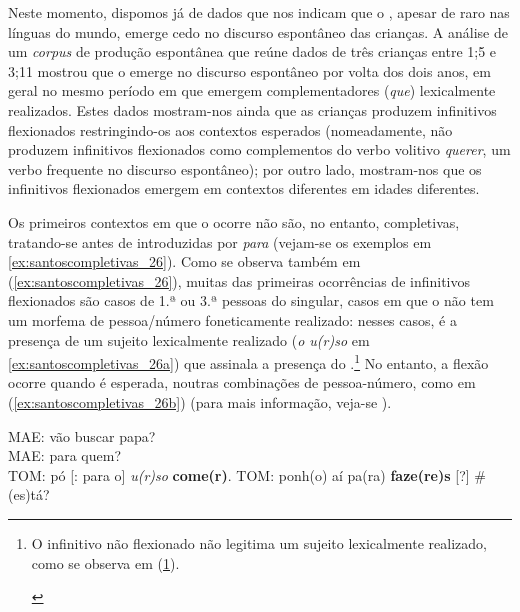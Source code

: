 \documentclass[output=paper]{LSP/langsci}
\begin{document}
Neste momento, dispomos já de dados que nos indicam que o , apesar de raro nas línguas do mundo, emerge cedo no discurso espontâneo das crianças. A análise de um \textit{corpus} de produção espontânea que reúne dados de três crianças entre 1;5 e 3;11 mostrou que o  emerge no discurso espontâneo por volta dos dois anos, em geral no mesmo período em que emergem complementadores (\textit{que}) lexicalmente realizados. Estes dados mostram-nos ainda que as crianças produzem infinitivos flexionados restringindo-os aos contextos esperados (nomeadamente, não produzem infinitivos flexionados como complementos do verbo volitivo \textit{querer}, um verbo frequente no discurso espontâneo); por outro lado, mostram-nos que os infinitivos flexionados emergem em contextos diferentes em idades diferentes.

Os primeiros contextos em que o  ocorre não são, no entanto, completivas, tratando-se antes de  introduzidas por \textit{para} (vejam-se os exemplos em \ref{ex:santoscompletivas_26}). Como se observa também em (\ref{ex:santoscompletivas_26}), muitas das primeiras ocorrências de infinitivos flexionados são casos de 1.ª ou 3.ª pessoas do singular, casos em que o  não tem um morfema de pessoa/número foneticamente realizado: nesses casos, é a presença de um sujeito lexicalmente realizado (\textit{o u(r)so} em \ref{ex:santoscompletivas_26a}) que assinala a presença do .\footnote{O infinitivo não flexionado não legitima um sujeito lexicalmente realizado, como se observa em (\ref{ex:santoscompletivas_i}).

\ea\label{ex:santoscompletivas_i}
\zl
}
No entanto, a flexão ocorre quando é esperada, noutras combinações de pessoa-número, como em (\ref{ex:santoscompletivas_26b}) (para mais informação, veja-se \citealt{santos_rothman_etal2013}).

\ea\label{ex:santoscompletivas_26}
\ea\label{ex:santoscompletivas_26a} MAE: vão buscar papa?\\MAE: para quem?\\TOM:  pó [: para o] \textit{u(r)so} \textbf{come(r)}.
\ex\label{ex:santoscompletivas_26b} TOM: ponh(o) aí pa(ra) \textbf{faze(re)s} [?] \# (es)tá?\\
\zl
\end{document}
